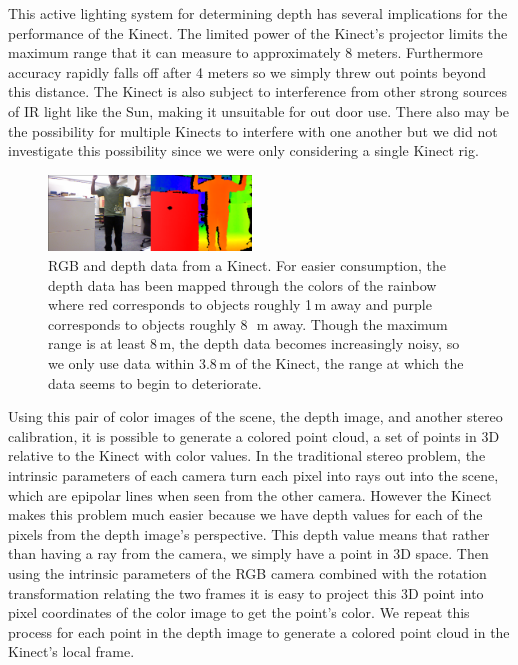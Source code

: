 \documentclass[letterpaper, 10pt, conference]{ieeeconf}
\begin{document}
This active lighting system for determining depth has several implications for the performance of the Kinect.  The limited power of the Kinect's projector limits the maximum range that it can measure to approximately 8 meters.  Furthermore accuracy rapidly falls off after 4 meters so we simply threw out points beyond this distance.   The Kinect is also subject to interference from other strong sources of IR light like the Sun, making it unsuitable for out door use.  There also may be the possibility for multiple Kinects to interfere with one another but we did not investigate this possibility since we were only considering a single Kinect rig.  

\begin{figure}
\centering
\includegraphics[width=0.48\textwidth]{figures/KinectDemo.png}
\caption{RGB and depth data from a Kinect. For easier consumption, the depth
data has been mapped through the colors of the rainbow where red corresponds
to objects roughly 1\,m away and purple corresponds to objects roughly 8~\,m
away. Though the maximum range is at least 8\,m, the depth data
becomes increasingly noisy, so we only use data within 3.8\,m of the Kinect,
the range at which the data seems to begin to deteriorate.}
\label{fig:Kinect-demo}
\end{figure}

Using this pair of color images of the scene, the depth image, and another stereo calibration, it is possible to generate a colored point cloud, a set of points in 3D relative to the Kinect with color values.  In the traditional stereo problem, the intrinsic parameters of each camera turn each pixel into rays out into the scene, which are epipolar lines when seen from the other camera.  However the Kinect makes this problem much easier because we have depth values for each of the pixels from the depth image's perspective.  This depth value means that rather than having a ray from the camera, we simply have a point in 3D space.  Then using the intrinsic parameters of the RGB camera combined with the rotation transformation relating the two frames it is easy to project this 3D point into pixel coordinates of the color image to get the point's color.  We repeat this process for each point in the depth image to generate a colored point cloud in the Kinect's local frame.  
\end{document}
